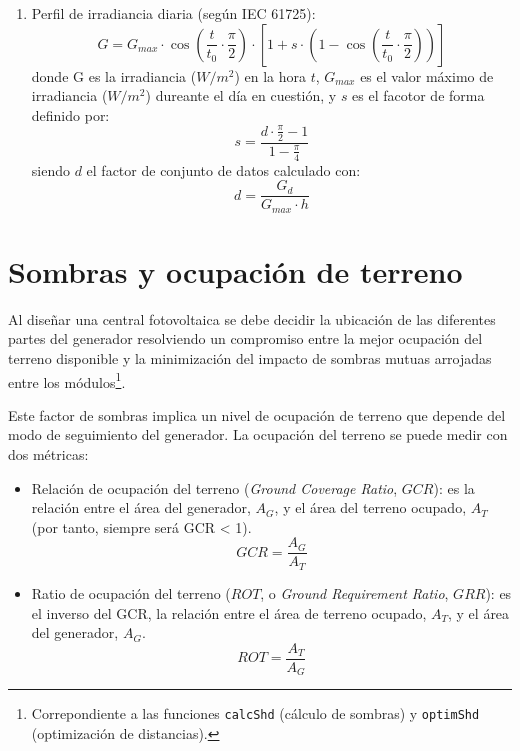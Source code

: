 \begin{enumerate}
\item Perfil de irradiancia diaria (según IEC 61725):
\begin{equation}
G = G_{max} \cdot \cos\left(\frac{t}{t_0} \cdot \frac{\pi}{2}\right) \cdot \left[1 + s \cdot \left(1 - \cos\left(\frac{t}{t_0} \cdot \frac{\pi}{2}\right)\right)\right]
\end{equation}
donde G es la irradiancia (\(W/m^2\)) en la hora \(t\), \(G_{max}\) es el valor máximo de irradiancia (\(W/m^2\)) dureante el día en cuestión, y \(s\) es el facotor de forma definido por:
\begin{equation}
s = \frac{d \cdot \frac{\pi}{2} - 1}{1 - \frac{\pi}{4}}
\end{equation}
siendo \(d\) el factor de conjunto de datos calculado con:
\begin{equation}
d = \frac{G_d}{G_{max} \cdot h}
\end{equation}
\end{enumerate}

\section{Sombras y ocupación de terreno}
\label{sec:org34ffc4d}
Al diseñar una central fotovoltaica se debe decidir la ubicación de las diferentes partes del generador resolviendo un compromiso entre la mejor ocupación del terreno disponible y la minimización del impacto de sombras mutuas arrojadas entre los módulos\footnote{Correpondiente a las funciones \texttt{calcShd} (cálculo de sombras) y \texttt{optimShd} (optimización de distancias).}.

Este factor de sombras implica un nivel de ocupación de terreno que depende del modo de seguimiento del generador. La ocupación del terreno se puede medir con dos métricas:
\begin{itemize}
\item Relación de ocupación del terreno (\emph{Ground Coverage Ratio}, \(GCR\)): es la relación entre el área del generador, \(A_G\), y el área del terreno ocupado, \(A_T\) (por tanto, siempre será GCR < 1).  
\begin{equation}
GCR = \frac{A_G}{A_T}
\end{equation}
\item Ratio de ocupación del terreno (\(ROT\), o \emph{Ground Requirement Ratio}, \(GRR\)): es el inverso del GCR, la relación entre el área de terreno ocupado, \(A_T\), y el área del generador, \(A_G\). 
\begin{equation}
ROT = \frac{A_T}{A_G}
\end{equation}
\end{itemize}

